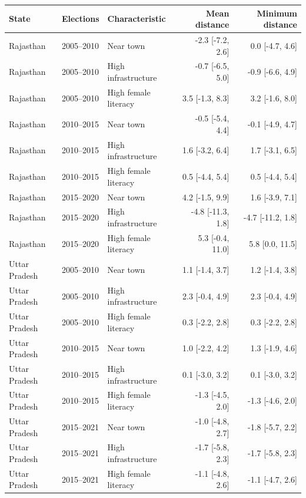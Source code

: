 
\begin{tabular}{lllrr}
\toprule
State & Elections & Characteristic & Mean distance & Minimum distance\\
\midrule
Rajasthan & 2005--2010 & Near town & -2.3 [-7.2, 2.6] & 0.0 [-4.7, 4.6]\\
Rajasthan & 2005--2010 & High infrastructure & -0.7 [-6.5, 5.0] & -0.9 [-6.6, 4.9]\\
Rajasthan & 2005--2010 & High female literacy & 3.5 [-1.3, 8.3] & 3.2 [-1.6, 8.0]\\
Rajasthan & 2010--2015 & Near town & -0.5 [-5.4, 4.4] & -0.1 [-4.9, 4.7]\\
Rajasthan & 2010--2015 & High infrastructure & 1.6 [-3.2, 6.4] & 1.7 [-3.1, 6.5]\\
\addlinespace
Rajasthan & 2010--2015 & High female literacy & 0.5 [-4.4, 5.4] & 0.5 [-4.4, 5.4]\\
Rajasthan & 2015--2020 & Near town & 4.2 [-1.5, 9.9] & 1.6 [-3.9, 7.1]\\
Rajasthan & 2015--2020 & High infrastructure & -4.8 [-11.3, 1.8] & -4.7 [-11.2, 1.8]\\
Rajasthan & 2015--2020 & High female literacy & 5.3 [-0.4, 11.0] & 5.8 [0.0, 11.5]\\
Uttar Pradesh & 2005--2010 & Near town & 1.1 [-1.4, 3.7] & 1.2 [-1.4, 3.8]\\
\addlinespace
Uttar Pradesh & 2005--2010 & High infrastructure & 2.3 [-0.4, 4.9] & 2.3 [-0.4, 4.9]\\
Uttar Pradesh & 2005--2010 & High female literacy & 0.3 [-2.2, 2.8] & 0.3 [-2.2, 2.8]\\
Uttar Pradesh & 2010--2015 & Near town & 1.0 [-2.2, 4.2] & 1.3 [-1.9, 4.6]\\
Uttar Pradesh & 2010--2015 & High infrastructure & 0.1 [-3.0, 3.2] & 0.1 [-3.0, 3.2]\\
Uttar Pradesh & 2010--2015 & High female literacy & -1.3 [-4.5, 2.0] & -1.3 [-4.6, 2.0]\\
\addlinespace
Uttar Pradesh & 2015--2021 & Near town & -1.0 [-4.8, 2.7] & -1.8 [-5.7, 2.2]\\
Uttar Pradesh & 2015--2021 & High infrastructure & -1.7 [-5.8, 2.3] & -1.7 [-5.8, 2.3]\\
Uttar Pradesh & 2015--2021 & High female literacy & -1.1 [-4.8, 2.6] & -1.1 [-4.7, 2.6]\\
\bottomrule
\end{tabular}
